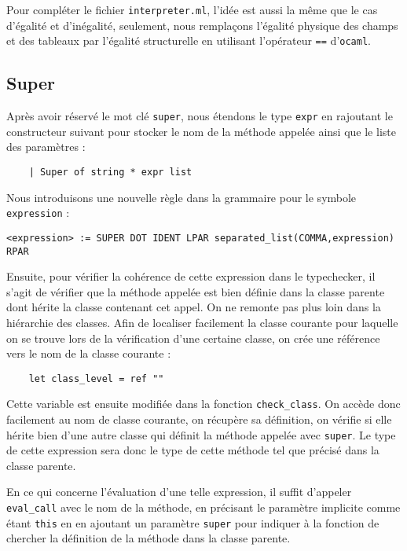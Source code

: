 \documentclass{article}
\begin{document}
Pour compléter le fichier \texttt{interpreter.ml}, l'idée est aussi la même que le cas d'égalité et d'inégalité, seulement, 
nous remplaçons l'égalité physique des champs et des tableaux par l'égalité structurelle en utilisant l'opérateur \texttt{==} d'\texttt{ocaml}.

\subsection{Super}
Après avoir réservé le mot clé \texttt{super}, nous étendons le type \texttt{expr} en rajoutant 
le constructeur suivant pour stocker le nom de la méthode appelée ainsi que le liste des paramètres : 
\begin{verbatim}
    | Super of string * expr list
\end{verbatim}

Nous introduisons une nouvelle règle dans la grammaire pour le symbole \texttt{expression} : 
\begin{lstlisting}[style=mystyle]
    <expression> := SUPER DOT IDENT LPAR separated_list(COMMA,expression) RPAR 
\end{lstlisting}

Ensuite, pour vérifier la cohérence de cette expression dans le typechecker, il s'agit de vérifier que la méthode appelée est bien définie dans la classe parente 
dont hérite la classe contenant cet appel. On ne remonte pas plus loin dans la hiérarchie des classes.
Afin de localiser facilement la classe courante pour laquelle on se trouve lors de la vérification d'une certaine 
classe, on crée une référence vers le nom de la classe courante : 
\begin{verbatim}
    let class_level = ref ""
\end{verbatim}

Cette variable est ensuite modifiée dans la fonction \texttt{check\_class}.
On accède donc facilement au nom de classe courante, on récupère sa définition, on vérifie si elle hérite bien d'une 
autre classe qui définit la méthode appelée avec \texttt{super}. Le type de cette expression sera donc 
le type de cette méthode tel que précisé dans la classe parente.

En ce qui concerne l'évaluation d'une telle expression, il suffit 
d'appeler \texttt{eval\_call} avec le nom de la méthode, en précisant le 
paramètre implicite comme étant \texttt{this} en en ajoutant un paramètre \texttt{super}
pour indiquer à la fonction de chercher la définition de la méthode 
dans la classe parente.
\end{document}
